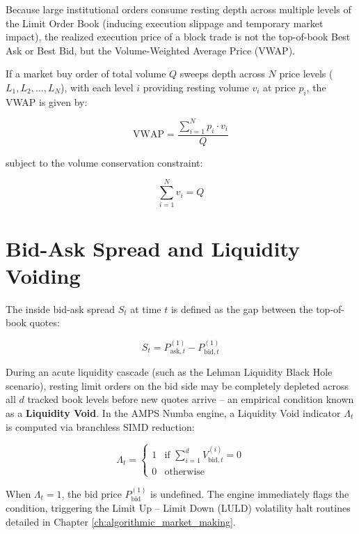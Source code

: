 Because large institutional orders consume resting depth across multiple levels of the Limit Order Book (inducing execution slippage and temporary market impact), the realized execution price of a block trade is not the top-of-book Best Ask or Best Bid, but the Volume-Weighted Average Price (VWAP).

If a market buy order of total volume $Q$ sweeps depth across $N$ price levels ($L_1, L_2, \dots, L_N$), with each level $i$ providing resting volume $v_i$ at price $p_i$, the VWAP is given by:

\begin{equation}
    \text{VWAP} = \frac{\sum_{i=1}^{N} p_i \cdot v_i}{Q}
\end{equation}

subject to the volume conservation constraint:

\begin{equation}
    \sum_{i=1}^{N} v_i = Q
\end{equation}

\section{Bid-Ask Spread and Liquidity Voiding}

The inside bid-ask spread $S_t$ at time $t$ is defined as the gap between the top-of-book quotes:

\begin{equation}
    S_t = P_{\text{ask}, t}^{(1)} - P_{\text{bid}, t}^{(1)}
\end{equation}

During an acute liquidity cascade (such as the Lehman Liquidity Black Hole scenario), resting limit orders on the bid side may be completely depleted across all $d$ tracked book levels before new quotes arrive -- an empirical condition known as a \textbf{Liquidity Void}. In the AMPS Numba engine, a Liquidity Void indicator $\Lambda_t$ is computed via branchless SIMD reduction:

\begin{equation}
    \Lambda_t = \begin{cases} 
      1 & \text{if } \sum_{i=1}^{d} V_{\text{bid}, t}^{(i)} = 0 \\
      0 & \text{otherwise}
   \end{cases}
\end{equation}

When $\Lambda_t = 1$, the bid price $P_{\text{bid}}^{(1)}$ is undefined. The engine immediately flags the condition, triggering the Limit Up -- Limit Down (LULD) volatility halt routines detailed in Chapter \ref{ch:algorithmic_market_making}.
